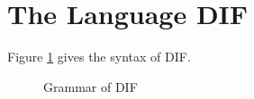 \section{The Language DIF}
Figure \ref{figure_grammar} gives the syntax of DIF.

\begin{figure}[h]
    
    \caption{Grammar of DIF}
    \label{figure_grammar}
\end{figure}
